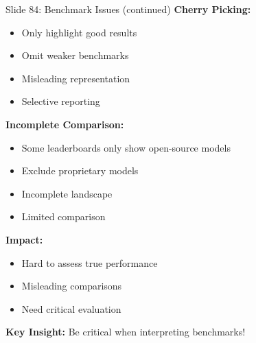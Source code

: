 \documentclass[8pt]{beamer}
\begin{document}
	\begin{frame}{Slide 84: Benchmark Issues (continued)}
		\fontsize{6.5}{7.5}\selectfont
		\textbf{Cherry Picking:}
		\begin{itemize}
			\item Only highlight good results
			\item Omit weaker benchmarks
			\item Misleading representation
			\item Selective reporting
		\end{itemize}
		
		\vspace{0.1cm}
		\textbf{Incomplete Comparison:}
		\begin{itemize}
			\item Some leaderboards only show open-source models
			\item Exclude proprietary models
			\item Incomplete landscape
			\item Limited comparison
		\end{itemize}
		
		\vspace{0.1cm}
		\textbf{Impact:}
		\begin{itemize}
			\item Hard to assess true performance
			\item Misleading comparisons
			\item Need critical evaluation
		\end{itemize}
		
		\textcolor{myblue}{\textbf{Key Insight:}} Be critical when interpreting benchmarks!
	\end{frame}
	
\end{document}
